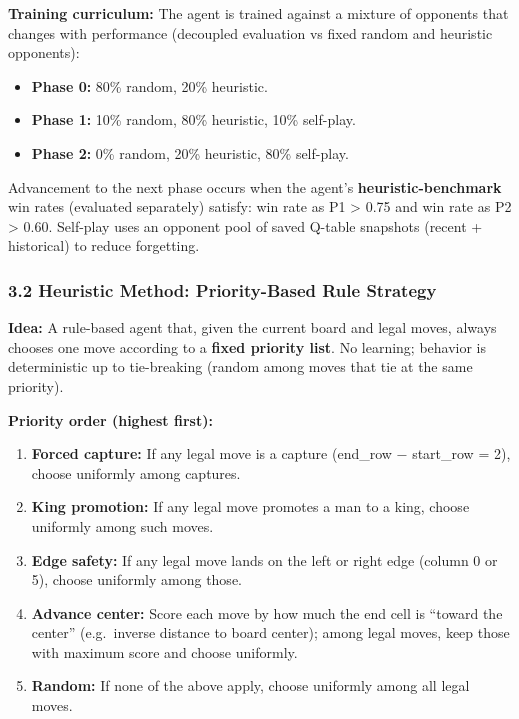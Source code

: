 \documentclass[
]{article}
\newcounter{none} %
\providecommand{\tightlist}{%
  \setlength{\itemsep}{0pt}\setlength{\parskip}{0pt}}
\begin{document}
\textbf{Training curriculum:} The agent is trained against a mixture of
opponents that changes with performance (decoupled evaluation vs fixed
random and heuristic opponents):

\begin{itemize}
\tightlist
\item
  \textbf{Phase 0:} 80\% random, 20\% heuristic.\\
\item
  \textbf{Phase 1:} 10\% random, 80\% heuristic, 10\% self-play.\\
\item
  \textbf{Phase 2:} 0\% random, 20\% heuristic, 80\% self-play.
\end{itemize}

Advancement to the next phase occurs when the agent's
\textbf{heuristic-benchmark} win rates (evaluated separately) satisfy:
win rate as P1 \textgreater{} 0.75 and win rate as P2 \textgreater{}
0.60. Self-play uses an opponent pool of saved Q-table snapshots (recent
+ historical) to reduce forgetting.

\subsubsection{3.2 Heuristic Method: Priority-Based Rule
Strategy}\label{heuristic-method-priority-based-rule-strategy}

\textbf{Idea:} A rule-based agent that, given the current board and
legal moves, always chooses one move according to a \textbf{fixed
priority list}. No learning; behavior is deterministic up to
tie-breaking (random among moves that tie at the same priority).

\textbf{Priority order (highest first):}

\begin{enumerate}
\def\labelenumi{\arabic{enumi}.}
\tightlist
\item
  \textbf{Forced capture:} If any legal move is a capture
  (\textbar end\_row − start\_row\textbar{} = 2), choose uniformly among
  captures.
\item
  \textbf{King promotion:} If any legal move promotes a man to a king,
  choose uniformly among such moves.
\item
  \textbf{Edge safety:} If any legal move lands on the left or right
  edge (column 0 or 5), choose uniformly among those.
\item
  \textbf{Advance center:} Score each move by how much the end cell is
  ``toward the center'' (e.g.~inverse distance to board center); among
  legal moves, keep those with maximum score and choose uniformly.
\item
  \textbf{Random:} If none of the above apply, choose uniformly among
  all legal moves.
\end{enumerate}
\end{document}

